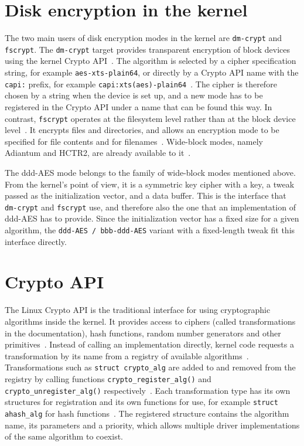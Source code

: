\documentclass[
  digital,     %
  oneside,     %
  nosansbold,  %
  nocolorbold, %
  lof,         %
  lot,         %
]{fithesis4}
\begin{document}
\section{Disk encryption in the kernel}

The two main users of disk encryption modes in the kernel are \texttt{dm-crypt} and \texttt{fscrypt}. The \texttt{dm-crypt} target provides transparent encryption of block devices using the kernel Crypto API~\cite{noauthor_dm-crypt_nodate}. The algorithm is selected by a cipher specification string, for example \texttt{aes-xts-plain64}, or directly by a Crypto API name with the \texttt{capi:} prefix, for example \texttt{capi:xts(aes)-plain64}~\cite{noauthor_dm-crypt_nodate}. The cipher is therefore chosen by a string when the device is set up, and a new mode has to be registered in the Crypto API under a name that can be found this way. In contrast, \texttt{fscrypt} operates at the filesystem level rather than at the block device level~\cite{noauthor_filesystem-level_nodate}. It encrypts files and directories, and allows an encryption mode to be specified for file contents and for filenames~\cite{noauthor_filesystem-level_nodate}. Wide-block modes, namely Adiantum and HCTR2, are already available to it~\cite{noauthor_filesystem-level_nodate, crowley_adiantum_2018, crowley_length-preserving_2021}.

The ddd-AES mode belongs to the family of wide-block modes mentioned above. From the kernel's point of view, it is a symmetric key cipher with a key, a tweak passed as the initialization vector, and a data buffer. This is the interface that \texttt{dm-crypt} and \texttt{fscrypt} use, and therefore also the one that an implementation of ddd-AES has to provide. Since the initialization vector has a fixed size for a given algorithm, the \texttt{ddd-AES / bbb-ddd-AES} variant with a fixed-length tweak fit this interface directly.

\section{Crypto API}

The Linux Crypto API is the traditional interface for using cryptographic algorithms inside the kernel. It provides access to ciphers (called transformations in the documentation), hash functions, random number generators and other primitives~\cite{noauthor_crypto_nodate-1}. Instead of calling an implementation directly, kernel code requests a transformation by its name from a registry of available algorithms~\cite{noauthor_kernel_nodate}. Transformations such as \texttt{struct crypto\_alg} are added to and removed from the registry by calling functions \texttt{crypto\_register\_alg()} and \texttt{crypto\_unregister\_alg()} respectively~\cite{noauthor_developing_nodate}. Each transformation type has its own structures for registration and its own functions for use, for example \texttt{struct ahash\_alg} for hash functions~\cite{noauthor_kernel_nodate}. The registered structure contains the algorithm name, its parameters and a priority, which allows multiple driver implementations of the same algorithm to coexist.
\end{document}
